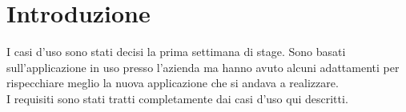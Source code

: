 \section{Introduzione}
\label{sec:introduzione-appendice}

I casi d'uso sono stati decisi la prima settimana di stage. Sono basati sull'applicazione in uso presso l'azienda ma hanno avuto alcuni adattamenti per rispecchiare meglio la nuova applicazione che si andava a realizzare.\\
I requisiti sono stati tratti completamente dai casi d'uso qui descritti.